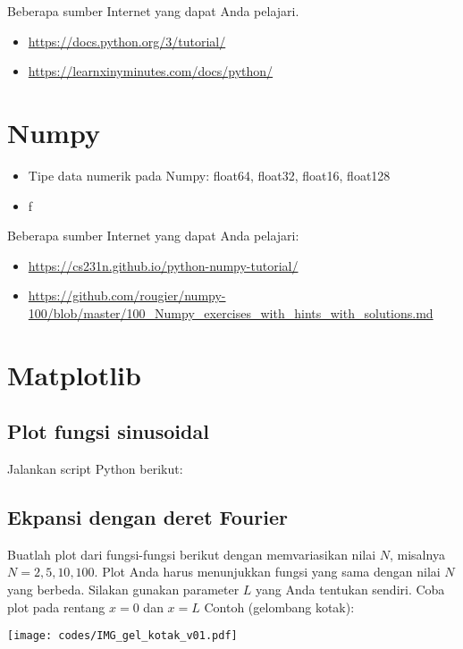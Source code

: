 \documentclass[a4paper,11pt,bahasa]{article} %
\begin{document}
Beberapa sumber Internet yang dapat Anda pelajari.
\begin{itemize}
\item {\footnotesize \url{https://docs.python.org/3/tutorial/}}
\item {\footnotesize \url{https://learnxinyminutes.com/docs/python/}}
\end{itemize}


\section{Numpy}

\begin{itemize}
\item Tipe data numerik pada Numpy: float64, float32, float16, float128
\item f
\end{itemize}


Beberapa sumber Internet yang dapat Anda pelajari:
\begin{itemize}
\item {\footnotesize \url{https://cs231n.github.io/python-numpy-tutorial/}}
\item {\footnotesize \url{https://github.com/rougier/numpy-100/blob/master/100_Numpy_exercises_with_hints_with_solutions.md}}
\end{itemize}

\section{Matplotlib}


\subsection{Plot fungsi sinusoidal}

Jalankan script Python berikut:

\subsection{Ekpansi dengan deret Fourier}

Buatlah plot dari fungsi-fungsi berikut dengan memvariasikan nilai $N$, misalnya
$N = 2, 5, 10, 100$. Plot Anda harus menunjukkan fungsi yang sama dengan nilai $N$
yang berbeda.
Silakan gunakan parameter $L$ yang Anda tentukan sendiri. Coba plot pada rentang
$x=0$ dan $x=L$
Contoh (gelombang kotak):
{\center
\texttt{[image: codes/IMG\_gel\_kotak\_v01.pdf]}
\par}
\end{document}

